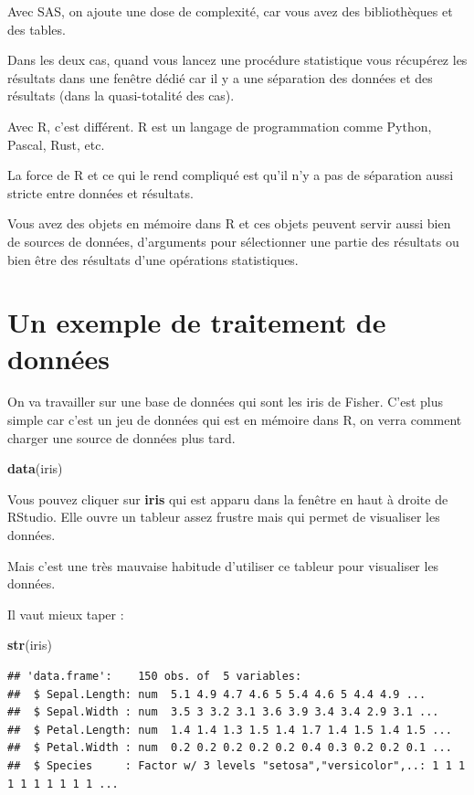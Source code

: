 \documentclass[
]{book}
\newenvironment{Shaded}{\begin{snugshade}}{\end{snugshade}}
\newcommand{\FunctionTok}[1]{\textcolor[rgb]{0.13,0.29,0.53}{\textbf{#1}}}
\newcommand{\NormalTok}[1]{#1}
\begin{document}
Avec SAS, on ajoute une dose de complexité, car vous avez des bibliothèques
et des tables.

Dans les deux cas, quand vous lancez une procédure statistique vous récupérez
les résultats dans une fenêtre dédié car il y a une séparation des données
et des résultats (dans la quasi-totalité des cas).

Avec R, c'est différent. R est un langage de programmation comme Python, Pascal,
Rust, etc.

La force de R et ce qui le rend compliqué est qu'il n'y a pas de séparation aussi
stricte entre données et résultats.

Vous avez des objets en mémoire dans R et ces objets peuvent servir aussi bien
de sources de données, d'arguments pour sélectionner une partie des résultats ou
bien être des résultats d'une opérations statistiques.

\hypertarget{un-exemple-de-traitement-de-donnuxe9es}{%
\section{Un exemple de traitement de données}\label{un-exemple-de-traitement-de-donnuxe9es}}

On va travailler sur une base de données qui sont les iris de Fisher. C'est
plus simple car c'est un jeu de données qui est en mémoire dans R, on verra
comment charger une source de données plus tard.

\begin{Shaded}
\begin{Highlighting}[]
\FunctionTok{data}\NormalTok{(iris)}
\end{Highlighting}
\end{Shaded}

Vous pouvez cliquer sur \textbf{iris} qui est apparu dans la fenêtre en haut
à droite de RStudio. Elle ouvre un tableur assez frustre mais qui permet
de visualiser les données.

Mais c'est une très mauvaise habitude d'utiliser ce tableur pour visualiser
les données.

Il vaut mieux taper :

\begin{Shaded}
\begin{Highlighting}[]
\FunctionTok{str}\NormalTok{(iris)}
\end{Highlighting}
\end{Shaded}

\begin{verbatim}
## 'data.frame':    150 obs. of  5 variables:
##  $ Sepal.Length: num  5.1 4.9 4.7 4.6 5 5.4 4.6 5 4.4 4.9 ...
##  $ Sepal.Width : num  3.5 3 3.2 3.1 3.6 3.9 3.4 3.4 2.9 3.1 ...
##  $ Petal.Length: num  1.4 1.4 1.3 1.5 1.4 1.7 1.4 1.5 1.4 1.5 ...
##  $ Petal.Width : num  0.2 0.2 0.2 0.2 0.2 0.4 0.3 0.2 0.2 0.1 ...
##  $ Species     : Factor w/ 3 levels "setosa","versicolor",..: 1 1 1 1 1 1 1 1 1 1 ...
\end{verbatim}
\end{document}
